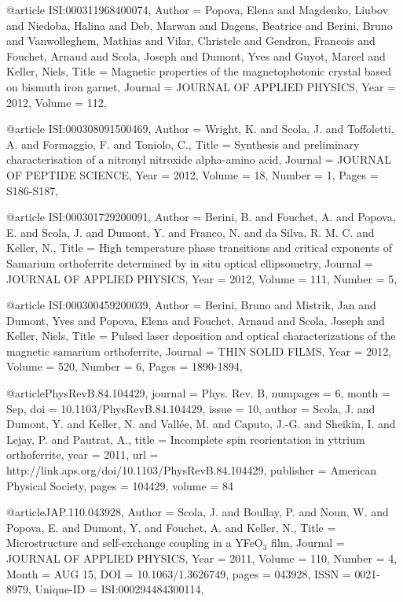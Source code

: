 {@article{ ISI:000311968400074,
Author = {Popova, Elena and Magdenko, Liubov and Niedoba, Halina and Deb, Marwan
   and Dagens, Beatrice and Berini, Bruno and Vanwolleghem, Mathias and
   Vilar, Christele and Gendron, Francois and Fouchet, Arnaud and Scola,
   Joseph and Dumont, Yves and Guyot, Marcel and Keller, Niels},
Title = {{Magnetic properties of the magnetophotonic crystal based on bismuth iron
   garnet}},
Journal = {{JOURNAL OF APPLIED PHYSICS}},
Year = {{2012}},
Volume = {{112}},
}


@article{ ISI:000308091500469,
Author = {Wright, K. and Scola, J. and Toffoletti, A. and Formaggio, F. and
   Toniolo, C.},
Title = {{Synthesis and preliminary characterisation of a nitronyl nitroxide
   alpha-amino acid}},
Journal = {{JOURNAL OF PEPTIDE SCIENCE}},
Year = {{2012}},
Volume = {{18}},
Number = {{1}},
Pages = {{S186-S187}},
}


@article{ ISI:000301729200091,
Author = {Berini, B. and Fouchet, A. and Popova, E. and Scola, J. and Dumont, Y.
   and Franco, N. and da Silva, R. M. C. and Keller, N.},
Title = {{High temperature phase transitions and critical exponents of Samarium
   orthoferrite determined by in situ optical ellipsometry}},
Journal = {{JOURNAL OF APPLIED PHYSICS}},
Year = {{2012}},
Volume = {{111}},
Number = {{5}},
}


@article{ ISI:000300459200039,
Author = {Berini, Bruno and Mistrik, Jan and Dumont, Yves and Popova, Elena and
   Fouchet, Arnaud and Scola, Joseph and Keller, Niels},
Title = {{Pulsed laser deposition and optical characterizations of the magnetic
   samarium orthoferrite}},
Journal = {{THIN SOLID FILMS}},
Year = {{2012}},
Volume = {{520}},
Number = {{6}},
Pages = {{1890-1894}},
}


@article{PhysRevB.84.104429,
  journal = {Phys. Rev. B},
  numpages = {6},
  month = {Sep},
  doi = {10.1103/PhysRevB.84.104429},
  issue = {10},
  author = {Scola, J. and Dumont, Y. and Keller, N. and Vall\'ee, M. and Caputo, J.-G. and Sheikin, I. and Lejay, P. and Pautrat, A.},
  title = {Incomplete spin reorientation in yttrium orthoferrite},
  year = {2011},
  url = {http://link.aps.org/doi/10.1103/PhysRevB.84.104429},
  publisher = {American Physical Society},
  pages = {104429},
  volume = {84}
}


@article{JAP.110.043928,
Author = {Scola, J. and Boullay, P. and Noun, W. and Popova, E. and Dumont, Y. and
   Fouchet, A. and Keller, N.},
Title = {{Microstructure and self-exchange coupling in a YFeO$_3$ film}},
Journal = {{JOURNAL OF APPLIED PHYSICS}},
Year = {{2011}},
Volume = {{110}},
Number = {{4}},
Month = {{AUG 15}},
DOI = {{10.1063/1.3626749}},
pages = {{043928}},
ISSN = {{0021-8979}},
Unique-ID = {{ISI:000294484300114}},
}


}
